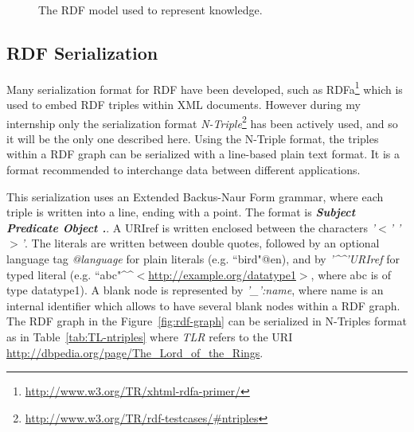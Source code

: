 \begin{figure}
%
\caption{The RDF model used to represent knowledge.}
\end{figure}

\subsection{RDF Serialization}

Many serialization format for RDF have been developed, such as
RDFa\footnote{\url{http://www.w3.org/TR/xhtml-rdfa-primer/}} which is used to
embed RDF triples within XML documents. However during my internship only the
serialization format
\emph{N-Triple}\footnote{\url{http://www.w3.org/TR/rdf-testcases/\#ntriples}}
has been actively used, and so it will be the only one described here. Using
the N-Triple format, the triples within a RDF graph can be serialized with a
line-based plain text format. It is a format recommended to interchange data
between different applications.

This serialization uses an Extended Backus-Naur Form grammar, where each triple
is written into a line, ending with a point. The format is {\bfseries
\emph{Subject Predicate Object .}}\hs.
A URIref is written enclosed between the characters \emph{'$<$' '$>$'}. The
literals are written between double quotes, followed by an optional language
tag \emph{@language} for plain literals (e.g. ``bird"@en), and by
\emph{'\^{}\^{}'URIref} for typed literal (e.g.
``abc"\^{}\^{}$<$\url{http://example.org/datatype1}$>$, where abc is of type
datatype1). A blank node is represented by \emph{'\_':name}, where name is an
internal identifier which allows to have several blank nodes within a RDF
graph. The RDF graph in the Figure~\ref{fig:rdf-graph} can be serialized in
N-Triples format as in Table~\ref{tab:TL-ntriples} where \emph{TLR} refers to
the URI \url{http://dbpedia.org/page/The_Lord_of_the_Rings}.

